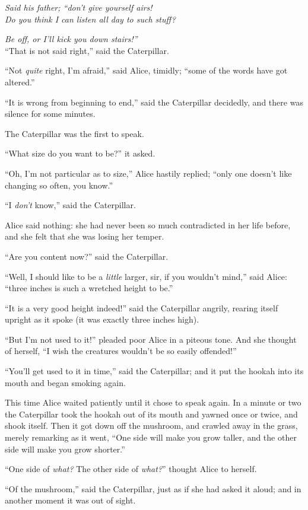 \documentclass[book, 20pt]{extbook}
\begin{document}
\emph{Said his father; ``don't give yourself airs!\\}
\noindent\emph{Do you think I can listen all day to such stuff?}

\emph{Be off, or I'll kick you down stairs!''\\}
\bigskip
``That is not said right,'' said the Caterpillar.

``Not \emph{quite} right, I'm afraid,'' said Alice, timidly; ``some of
the words have got altered.''

``It is wrong from beginning to end,'' said the Caterpillar decidedly,
and there was silence for some minutes.

The Caterpillar was the first to speak.

``What size do you want to be?'' it asked.

``Oh, I'm not particular as to size,'' Alice hastily replied; ``only one
doesn't like changing so often, you know.''

``I \emph{don't} know,'' said the Caterpillar.

Alice said nothing: she had never been so much contradicted in her life
before, and she felt that she was losing her temper.

``Are you content now?'' said the Caterpillar.

``Well, I should like to be a \emph{little} larger, sir, if you wouldn't
mind,'' said Alice: ``three inches is such a wretched height to be.''

``It is a very good height indeed!'' said the Caterpillar angrily,
rearing itself upright as it spoke (it was exactly three inches high).

``But I'm not used to it!'' pleaded poor Alice in a piteous tone. And
she thought of herself, ``I wish the creatures wouldn't be so easily
offended!''

``You'll get used to it in time,'' said the Caterpillar; and it put the
hookah into its mouth and began smoking again.

This time Alice waited patiently until it chose to speak again. In a
minute or two the Caterpillar took the hookah out of its mouth and
yawned once or twice, and shook itself. Then it got down off the
mushroom, and crawled away in the grass, merely remarking as it went,
``One side will make you grow taller, and the other side will make you
grow shorter.''

``One side of \emph{what?} The other side of \emph{what?}'' thought
Alice to herself.

``Of the mushroom,'' said the Caterpillar, just as if she had asked it
aloud; and in another moment it was out of sight.
\end{document}
